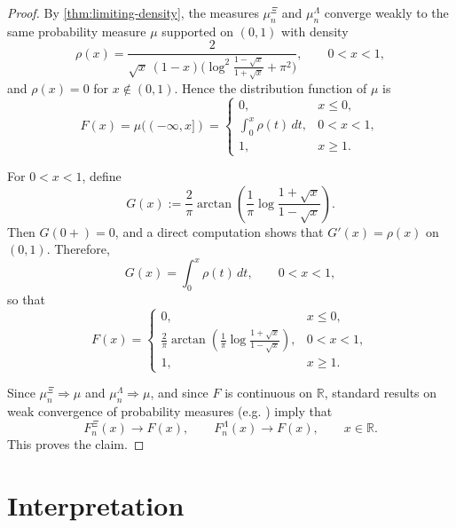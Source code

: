 \documentclass[11pt,twoside]{article}
\numberwithin{equation}{section}
\begin{document}
\begin{proof}
By \cref{thm:limiting-density}, the measures \(\mu_n^{\Xi}\) and \(\mu_n^{\Lambda}\) converge
weakly to the same probability measure \(\mu\) supported on \((0,1)\) with density
\[
\rho(x)=\frac{2}{
  \sqrt{x}\,(1-x)
  \bigl(\log^2\!\tfrac{1-\sqrt{x}}{1+\sqrt{x}}+\pi^2\bigr)
},
\qquad 0<x<1,
\]
and \(\rho(x)=0\) for \(x\notin(0,1)\). Hence the distribution function of \(\mu\) is
\[
F(x)=\mu((-\infty,x])=
\begin{cases}
0, & x\le 0,\\[1mm]
\displaystyle \int_0^x \rho(t)\,dt, & 0<x<1,\\[3mm]
1, & x\ge 1.
\end{cases}
\]

For \(0<x<1\), define
\[
G(x):=\frac{2}{\pi}\arctan\!\left(
\frac{1}{\pi}\log\frac{1+\sqrt{x}}{1-\sqrt{x}}
\right).
\]
Then \(G(0+)=0\), and a direct computation shows that \(G'(x)=\rho(x)\) on \((0,1)\).
Therefore,
\[
G(x)=\int_0^x\rho(t)\,dt,
\qquad 0<x<1,
\]
so that
\[
F(x)=
\begin{cases}
0, & x\le 0,\\[1mm]
\displaystyle \frac{2}{\pi}\arctan\!\left(
  \frac{1}{\pi}\log\frac{1+\sqrt{x}}{1-\sqrt{x}}
\right), & 0<x<1,\\[3mm]
1, & x\ge 1.
\end{cases}
\]

Since \(\mu_n^{\Xi}\Rightarrow\mu\) and \(\mu_n^{\Lambda}\Rightarrow\mu\), and since \(F\) is
continuous on \(\mathbb{R}\), standard results on weak convergence of probability measures
(e.g. \cite[Thm.~2.3]{Billingsley-convergence}) imply that
\[
F_n^{\Xi}(x)\to F(x),
\qquad
F_n^{\Lambda}(x)\to F(x),
\qquad x\in\mathbb{R}.
\]
This proves the claim.
\end{proof}

\section{Interpretation}
\end{document}
